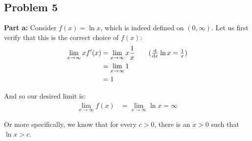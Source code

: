 \documentclass{article}
\begin{document}
\subsection*{Problem 5}
\noindent\textbf{Part a:} Consider $f(x)=\ln x$, which is indeed defined on $(0,\infty)$. Let us first verify that this is the correct choice of $f(x)$:
\begin{align*}
  \lim_{x\to\infty}xf'(x)&=\lim_{x\to\infty}x\frac{1}{x}\tag{$\dv{x}\ln x=\frac{1}{x}$}\\
  &=\lim_{x\to\infty}1\\
  &=1
\end{align*}

And so our desired limit is:
\begin{align*}
  \lim_{x\to\infty}f(x)&=\lim_{x\to\infty}\ln x=\infty\tag{$\ln$ can grow arbitrarily large as $x\to\infty$}
\end{align*}

Or more specifically, we know that for every $c>0$, there is an $x>0$ such  that $\ln x>c$.
\bigskip



\end{document}
